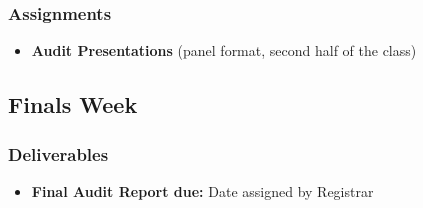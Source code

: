 \documentclass[12pt]{article}
\begin{document}
    \subsubsection*{Assignments}
        \begin{itemize}
            \item \textbf{Audit Presentations} (panel format, second half of the class)
        \end{itemize}

\subsection*{Finals Week}
    \subsubsection*{Deliverables}
        \begin{itemize}
            \item \textbf{Final Audit Report due:} Date assigned by Registrar
        \end{itemize}
\end{document}

